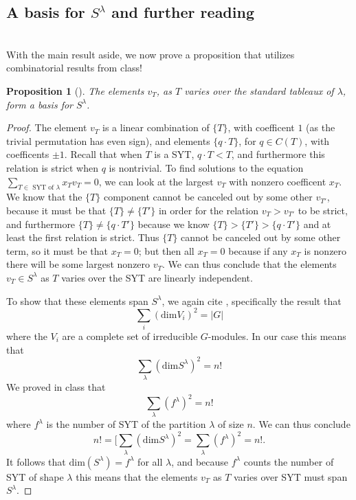 \documentclass[12pt,twoside]{reedthesis}
\theoremstyle{plain}   %
\newtheorem{prop}{Proposition}[section]
\theoremstyle{definition}
\theoremstyle{remark}
\numberwithin{equation}{section}
\def\dim{\mathrm{dim}}
\begin{document}
   \subsection{A basis for $S^\lambda$ and further reading} \hfill\\
   With the main result aside, we now prove a proposition that utilizes combinatorial results from class!
   \begin{prop}[{\cite[Pg. 88]{fulton}}]\label{prop1}
     The elements $v_T$, as $T$ varies over the \emph{standard} tableaux of $\lambda$, form a basis for $S^\lambda$.
   \end{prop}
   \begin{proof}
     The element $v_T$ is a linear combination of $\{T\}$, with coefficent $1$ (as the trivial permutation has even sign),
     and elements $\{q \cdot T\}$, for $q \in C(T)$, with coefficents $\pm 1$.
     Recall that when $T$ is a SYT, $q \cdot T < T$, and furthermore this relation is strict when $q$ is nontrivial.
     To find solutions to the equation $\sum_{T \in \text{ SYT of $\lambda$}} x_Tv_T = 0$,
     we can look at the largest $v_T$ with nonzero coefficent $x_T$.
     We know that the $\{T\}$ component cannot be canceled out by some other $v_{T'}$, because it must be that $\{T\} \neq \{T'\}$ in
     order for the relation $v_T > v_{T'}$ to be strict,
     and furthermore $\{T\} \neq \{q \cdot T'\}$ because we know $\{ T\} > \{T'\} > \{q \cdot T'\}$ and at least the first relation is strict.
     Thus $\{T\}$ cannot be canceled out by some other term, so it must be that $x_T = 0$; but then all $x_T = 0$ because
     if any $x_T$ is nonzero there will be some largest nonzero $v_T$.
     We can thus conclude that the elements $v_T \in S^\lambda$ as $T$ varies over the SYT are linearly independent. \par
     To show that these elements span $S^\lambda$, we again cite \cite[Proposition 1.10.1]{sagan}, specifically the result
     that
     \[ \sum_i (\dim V_i)^2 =|G| \]
     where the $V_i$ are a complete set of irreducible $G$-modules.
     In our case this means that
     \[\sum_\lambda (\dim S^\lambda)^2 = n!\]
     We proved in class that 
     \[ \sum_\lambda(f^\lambda)^2 = n!\]
     where $f^\lambda$ is the number of SYT of the partition $\lambda$ of size $n$.
     We can thus conclude
     \[ n! = [\sum_\lambda (\dim S^\lambda)^2 = \sum_\lambda(f^\lambda)^2 = n!.\]
     It follows that $\dim(S^\lambda) = f^\lambda$ for all $\lambda$, and because $f^\lambda$ counts the number of SYT of shape $\lambda$
     this means that the elements $v_T$ as $T$ varies over SYT must span $S^\lambda$.
   \end{proof}
\end{document}
